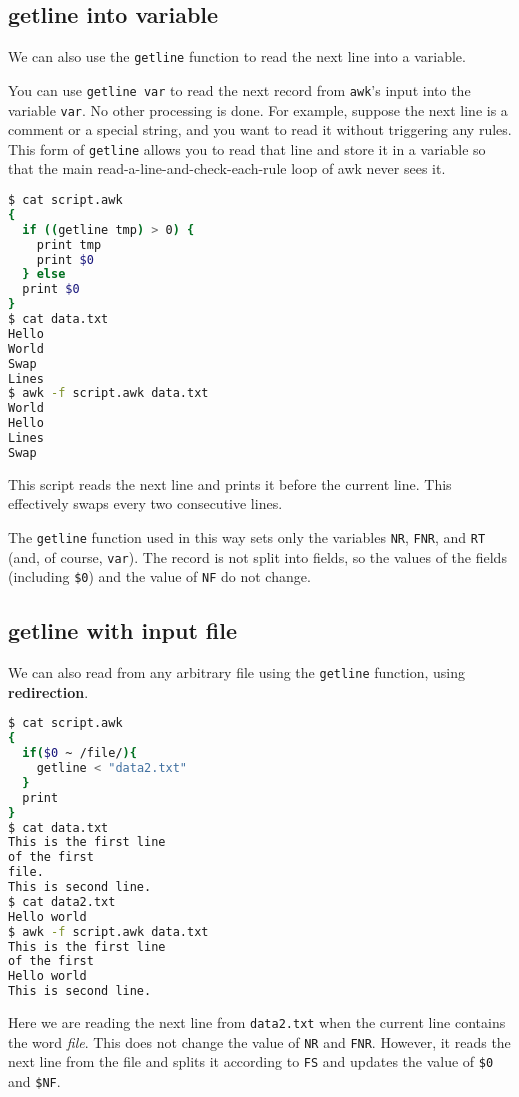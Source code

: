 \subsection{getline into variable}

We can also use the \lstinline|getline| function to read the next line into a variable.

You can use \lstinline|getline var| to read the next record from \lstinline|awk|'s input into the variable \lstinline|var|.
No other processing is done.
For example, suppose the next line is a comment or a special string, and you want to read it without triggering any rules.
This form of \lstinline|getline| allows you to read that line and store it in a variable so that the main read-a-line-and-check-each-rule loop of awk never sees it.

\begin{lstlisting}[language=bash]
$ cat script.awk
{
  if ((getline tmp) > 0) {
    print tmp
    print $0
  } else
  print $0
}
$ cat data.txt
Hello
World
Swap
Lines
$ awk -f script.awk data.txt
World
Hello
Lines
Swap
\end{lstlisting}

This script reads the next line and prints it before the current line.
This effectively swaps every two consecutive lines.

The \lstinline|getline| function used in this way sets only the variables \lstinline|NR|,
\lstinline|FNR|, and \lstinline|RT| (and, of course, \lstinline|var|).
The record is not split into fields, so the values of the fields (including \lstinline|$0|) and the value of \lstinline|NF| do not change.

\subsection{getline with input file}

We can also read from any arbitrary file using the \lstinline|getline| function, using \textbf{redirection}.

\begin{lstlisting}[language=bash]
$ cat script.awk
{
  if($0 ~ /file/){
    getline < "data2.txt"
  }
  print 
}
$ cat data.txt
This is the first line
of the first
file.
This is second line.
$ cat data2.txt
Hello world
$ awk -f script.awk data.txt
This is the first line
of the first
Hello world
This is second line.
\end{lstlisting}

Here we are reading the next line from \lstinline|data2.txt| when the current line contains the word \textit{file}.
This does not change the value of \lstinline|NR| and \lstinline|FNR|.
However, it reads the next line from the file and splits it according to \lstinline|FS| and updates the value of \lstinline|$0| and \lstinline|$NF|.

